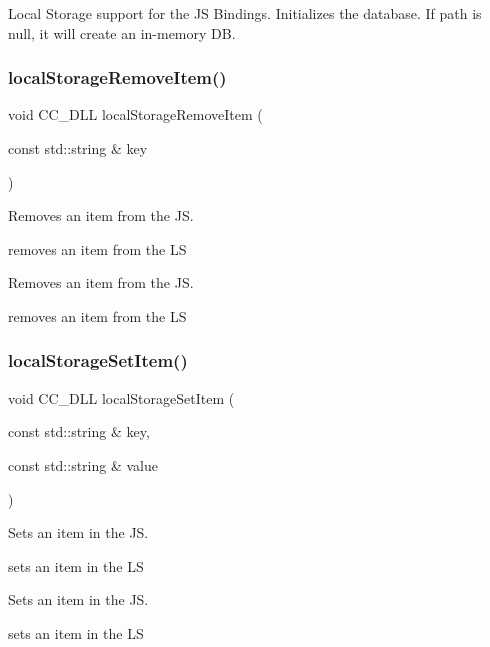 Local Storage support for the JS Bindings. Initializes the database. If path is null, it will create an in-\/memory DB. \mbox{\label{group__storage_ga2fa6ba39d0bb14577db8d67f17cdab02}} 
\subsubsection{\texorpdfstring{local\+Storage\+Remove\+Item()}{localStorageRemoveItem()}}
{\footnotesize\ttfamily void C\+C\+\_\+\+D\+LL local\+Storage\+Remove\+Item (\begin{DoxyParamCaption}\item[{const std\+::string \&}]{key }\end{DoxyParamCaption})}

Removes an item from the JS.

removes an item from the LS

Removes an item from the JS.

removes an item from the LS \mbox{\label{group__storage_gad0eeb24b389402c0cc09b5f5c019bbcb}} 
\subsubsection{\texorpdfstring{local\+Storage\+Set\+Item()}{localStorageSetItem()}}
{\footnotesize\ttfamily void C\+C\+\_\+\+D\+LL local\+Storage\+Set\+Item (\begin{DoxyParamCaption}\item[{const std\+::string \&}]{key,  }\item[{const std\+::string \&}]{value }\end{DoxyParamCaption})}

Sets an item in the JS.

sets an item in the LS

Sets an item in the JS.

sets an item in the LS 